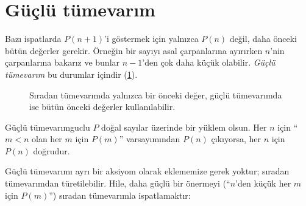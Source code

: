 \section{Güçlü tümevarım}\label{sec:guclu}

Bazı ispatlarda $P(n+1)$'i göstermek için yalnızca $P(n)$ değil, daha
önceki bütün değerler gerekir. Örneğin bir sayıyı asal çarpanlarına
ayırırken $n$'nin çarpanlarına bakarız ve bunlar $n-1$'den çok daha
küçük olabilir. \emph{Güçlü tümevarım} bu durumlar içindir
(\cref{fig:guclu}).

\begin{figure}[htbp]
\centering
{}
\caption{Sıradan tümevarımda yalnızca bir önceki değer, güçlü
tümevarımda ise bütün önceki değerler kullanılabilir.}
\label{fig:guclu}
\end{figure}

\begin{teorem}{Güçlü tümevarım}{guclu}
$P$ doğal sayılar üzerinde bir yüklem olsun. Her $n$ için ``$m < n$ olan
her $m$ için $P(m)$'' varsayımından $P(n)$ çıkıyorsa, her $n$ için $P(n)$
doğrudur.
\end{teorem}

\noindent Güçlü tümevarımı ayrı bir aksiyom olarak eklememize gerek
yoktur; sıradan tümevarımdan türetilebilir. Hile, daha güçlü bir önermeyi
(``$n$'den küçük her $m$ için $P(m)$'') sıradan tümevarımla ispatlamaktır:

